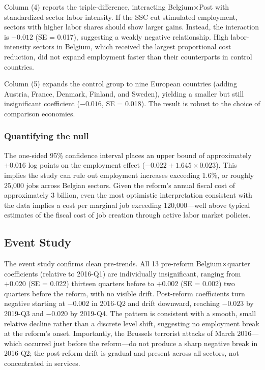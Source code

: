 \documentclass[12pt]{article}
\begin{document}
Column (4) reports the triple-difference, interacting Belgium$\times$Post with standardized sector labor intensity. If the SSC cut stimulated employment, sectors with higher labor shares should show larger gains. Instead, the interaction is $-0.012$ (SE = 0.017), suggesting a weakly negative relationship. High labor-intensity sectors in Belgium, which received the largest proportional cost reduction, did not expand employment faster than their counterparts in control countries.

Column (5) expands the control group to nine European countries (adding Austria, France, Denmark, Finland, and Sweden), yielding a smaller but still insignificant coefficient ($-0.016$, SE = 0.018). The result is robust to the choice of comparison economies.

\subsubsection*{Quantifying the null} The one-sided 95\% confidence interval places an upper bound of approximately $+0.016$ log points on the employment effect ($-0.022 + 1.645 \times 0.023$). This implies the study can rule out employment increases exceeding 1.6\%, or roughly 25,000 jobs across Belgian sectors. Given the reform's annual fiscal cost of approximately \texteuro{}3 billion, even the most optimistic interpretation consistent with the data implies a cost per marginal job exceeding \texteuro{}120,000---well above typical estimates of the fiscal cost of job creation through active labor market policies.

\subsection{Event Study}

The event study confirms clean pre-trends. All 13 pre-reform Belgium$\times$quarter coefficients (relative to 2016-Q1) are individually insignificant, ranging from $+0.020$ (SE = 0.022) thirteen quarters before to $+0.002$ (SE = 0.002) two quarters before the reform, with no visible drift. Post-reform coefficients turn negative starting at $-0.002$ in 2016-Q2 and drift downward, reaching $-0.023$ by 2019-Q3 and $-0.020$ by 2019-Q4. The pattern is consistent with a smooth, small relative decline rather than a discrete level shift, suggesting no employment break at the reform's onset. Importantly, the Brussels terrorist attacks of March 2016---which occurred just before the reform---do not produce a sharp negative break in 2016-Q2; the post-reform drift is gradual and present across all sectors, not concentrated in services.
\end{document}
